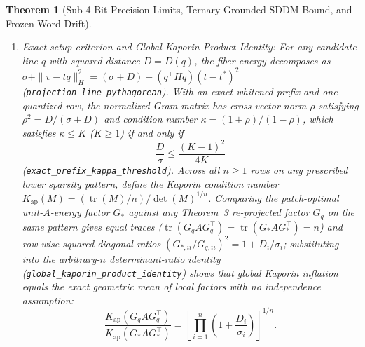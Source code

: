 \documentclass[10pt]{article}
\newtheorem{theorem}{Theorem}
\begin{document}
\begin{theorem}[Sub-4-Bit Precision Limits, Ternary Grounded-SDDM Bound, and Frozen-Word Drift]
\begin{enumerate}
  \item \emph{Exact setup criterion and Global Kaporin Product Identity:} For any candidate line $q$ with squared distance $D = D(q)$, the fiber energy decomposes as $\sigma + \|v - t q\|_H^2 = (\sigma + D) + (q^\top H q)(t - t^*)^2$ (\texttt{projection\_line\_pythagorean}). With an exact whitened prefix and one quantized row, the normalized Gram matrix has cross-vector norm $\rho$ satisfying $\rho^2 = D/(\sigma + D)$ and condition number $\kappa = (1 + \rho)/(1 - \rho)$, which satisfies $\kappa \le K$ ($K \ge 1$) \emph{if and only if}
  \[
    \frac{D}{\sigma} \le \frac{(K - 1)^2}{4 K}
  \]
  (\texttt{exact\_prefix\_kappa\_threshold}). Across all $n \ge 1$ rows on any prescribed lower sparsity pattern, define the Kaporin condition number $K_{\mathrm{ap}}(M) = (\operatorname{tr}(M)/n)/\det(M)^{1/n}$. Comparing the patch-optimal unit-$A$-energy factor $G_*$ against any Theorem~3 re-projected factor $G_q$ on the same pattern gives equal traces ($\operatorname{tr}(G_q A G_q^\top) = \operatorname{tr}(G_* A G_*^\top) = n$) and row-wise squared diagonal ratios $(G_{*,ii}/G_{q,ii})^2 = 1 + D_i/\sigma_i$; substituting into the arbitrary-$n$ determinant-ratio identity (\texttt{global\_kaporin\_product\_identity}) shows that global Kaporin inflation equals the exact geometric mean of local factors with no independence assumption:
  \[
    \frac{K_{\mathrm{ap}}(G_q A G_q^\top)}{K_{\mathrm{ap}}(G_* A G_*^\top)} = \left[\prod_{i=1}^n \left(1 + \frac{D_i}{\sigma_i}\right)\right]^{1/n}.
  \]

\end{enumerate}
\end{theorem}
\end{document}
